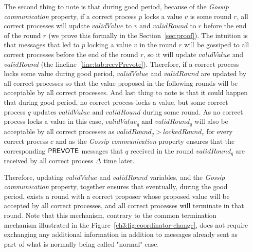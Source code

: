 The second thing to note is that during good period, because of the \emph{Gossip communication} property, if a correct process $p$ locks a value $v$ is some round $r$, all correct processes will update $validValue$ to $v$ and $validRound$ to $r$ before the end of the round $r$ (we prove this formally in the Section~\ref{sec:proof}). The intuition is that messages that led to $p$ locking a value $v$ in the round $r$ will be gossiped to all correct processes before the end of the round $r$, so it will update $validValue$ and $validRound$ (the lineline~\ref{line:tab:recvPrevote}). Therefore, if a correct process locks some value during good period, $validValue$ and $validRound$ are updated by all correct processes so that the value proposed in the following rounds will be acceptable by all correct processes. And last thing to note is that it could happen that during good period, no correct process locks a value, but some correct process $q$ updates $validValue$ and $validRound$ during some round. As no correct process locks a value in this case, $validValue_q$ and $validRound_q$ will also be acceptable by all correct processes as $validRound_q > lockedRound_c$ for every correct process $c$ and as the \emph{Gossip communication} property ensures that the corresponding $\mathsf{PREVOTE}$ messages that $q$ received in the round $validRound_q$ are received by all correct process $\Delta$ time later. 

Therefore, updating $validValue$ and $validRound$ variables, and the \emph{Gossip communication} property, together ensures that eventually, during the good period, exists a round with a correct proposer whose proposed value will be accepted by all correct processes, and all correct processes will terminate in that round. Note that this mechanism, contrary to the common termination mechanism illustrated in the Figure~\ref{ch3:fig:coordinator-change}, does not require exchanging any additional information in addition to messages already sent as part of what is normally being called "normal" case.     
